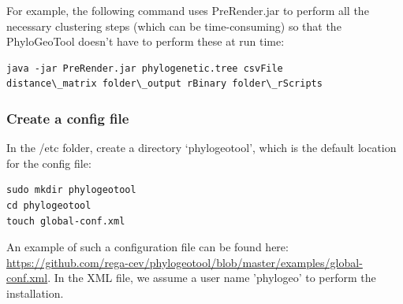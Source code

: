 \documentclass[a4paper, 11pt]{article} %
\begin{document}
For example, the following command uses PreRender.jar to perform all the necessary clustering steps (which can be time-consuming) so that the PhyloGeoTool doesn't have to perform these at run time: 
\begin{verbatim}
java -jar PreRender.jar phylogenetic.tree csvFile
distance\_matrix folder\_output rBinary folder\_rScripts
\end{verbatim}


\subsubsection{Create a config file} \label{sssec:config_file}

In the /etc folder, create a directory `phylogeotool', which is the default location for the config file:
\begin{verbatim}
sudo mkdir phylogeotool
cd phylogeotool
touch global-conf.xml
\end{verbatim}

An example of such a configuration file can be found here: \url{https://github.com/rega-cev/phylogeotool/blob/master/examples/global-conf.xml}.
In the XML file, we assume a user name 'phylogeo' to perform the installation.
\end{document}
